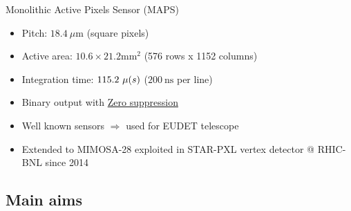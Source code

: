 \documentclass{beamer}
\newcommand{\grille}{
    \begin{tikzpicture}[overlay,remember picture]
        \begin{scope}[shift={(current page.south west)}]
            \draw[gray!50] (0,0) grid[step=2mm] (current page.north east);
            \draw[red!50] (0,0) grid[step=1cm] (current page.north east);
            \draw (0.2,1) node {1};
            \draw (0.2,2) node {2};
            \draw (0.2,3) node {3};
            \draw (0.2,4) node {4};
            \draw (0.2,5) node {5};
            \draw (0.2,6) node {6};
            \draw (0.2,7) node {7};
            \draw (0.2,8) node {8};
            \draw (0.2,9) node {9};
            \draw (1,0.5) node {1};
            \draw (2,0.5) node {2};
            \draw (3,0.5) node {3};
            \draw (4,0.5) node {4};
            \draw (5,0.5) node {5};
            \draw (6,0.5) node {6};
            \draw (7,0.5) node {7};
            \draw (8,0.5) node {8};
            \draw (9,0.5) node {9};
            \draw (10,0.5) node {10};
            \draw (11,0.5) node {11};
            \draw (12,0.5) node {12};
        \end{scope}
    \end{tikzpicture}
}
\begin{document}
\begin{frame}
  \begin{block}{Monolithic Active Pixels Sensor (MAPS)}
    \scriptsize{
    \begin{itemize}
      \item Pitch: $18.4~\mu\text{m}$ (square pixels)
      \item Active area: $10.6 \times 21.2 \text{mm}^2$ (576 rows x 1152 columns)
      \item Integration time: $115.2~\mu\text(s)$ ($200~\text{ns}$ per line)
      \item Binary output with \hyperlink{suze}{Zero suppression}
      \item Well known sensors $\Rightarrow$ used for EUDET telescope
      \item Extended to MIMOSA-28 exploited in STAR-PXL vertex detector @ RHIC-BNL since 2014
    \end{itemize}
   }
  \end{block}

\end{frame}

\subsection{Main aims}
\end{document}
